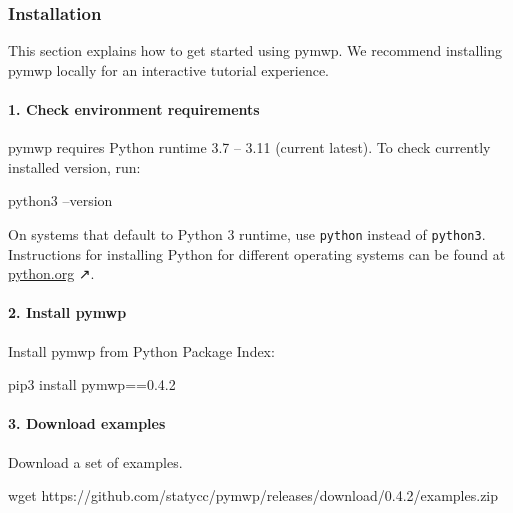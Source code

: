 \subsubsection{Installation}\label{guide-install}

This section explains how to get started using pymwp.
We recommend installing pymwp locally for an interactive tutorial experience.

\paragraph*{1. Check environment requirements}

pymwp requires Python runtime 3.7 -- 3.11 (current latest).
To check currently installed version, run:

\begin{center}
\begin{minipage}{\textwidth}
\begin{cmdlisting}[label={lst:python-version}]
python3 --version
\end{cmdlisting}
\end{minipage}
\end{center}

On systems that default to Python 3 runtime, use \texttt{python} instead of \texttt{python3}.
Instructions for installing Python for different operating systems can be found at \href{https://python.org}{python.org} ↗.

\paragraph*{2. Install pymwp}
Install pymwp from Python Package Index:

\begin{center}
\begin{minipage}{\textwidth}
\begin{cmdlisting}[label={lst:install-cmd}]
pip3 install pymwp==0.4.2
\end{cmdlisting}
\end{minipage}
\end{center}

\paragraph*{3. Download examples}
Download a set of examples.

\begin{center}
\begin{minipage}{\textwidth}
\begin{cmdlisting}[label={lst:get-examples}]
wget https://github.com/statycc/pymwp/releases/download/0.4.2/examples.zip
\end{cmdlisting}
\end{minipage}
\end{center}

